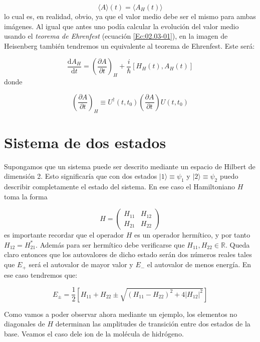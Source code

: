 \documentclass[12pt]{book}
\numberwithin{equation}{chapter}
\numberwithin{figure}{chapter}
\newcommand{\parentesis}[1]{\left( #1  \right)}
\newcommand{\parciales}[2]{\frac{\partial #1}{\partial #2}}
\newcommand{\ccorchetes}[1]{\left[ #1  \right]}
\newcommand{\D}{\mathrm{d}}
\newcommand{\derivadas}[2]{\frac{\D #1}{\D #2}}
\begin{document}
\begin{equation}
\langle A \rangle (t) = \langle A_H (t) \rangle
\end{equation}
lo cual es, en realidad, obvio, ya que el valor medio debe ser el mismo para ambas imágenes. Al igual que antes uno podía calcular la evolución del valor medio usando el \textit{teorema de Ehrenfest} (ecuación  \ref{Ec:02.03-01}), en la imagen de Heisenberg también tendremos un equivalente al teorema de Ehrenfest. Este será:

\begin{equation}
\derivadas{A_H}{t} = \parentesis{\parciales{A}{t}}_H + \frac{i}{\hbar} \ccorchetes{ H_H (t), A_H (t) }
\end{equation}
donde 

\begin{equation}
 \parentesis{\parciales{A}{t}}_H  \equiv U^\dagger (t,t_0) 
 \parentesis{\parciales{A}{t}} U (t,t_0)
\end{equation}


\section{Sistema de dos estados}

Supongamos que un sistema puede ser descrito mediante un espacio de Hilbert de dimensión 2. Esto significaría que con dos estados $|1\rangle \equiv \psi_1$ y $|2\rangle \equiv \psi_2$ puedo describir completamente el estado del sistema. En ese caso el Hamiltoniano $H$ toma la forma

\begin{equation}
H = \begin{pmatrix}
H_{11} & H_{12} \\
H_{21} & H_{22}
\end{pmatrix}
\end{equation} 
es importante recordar que el operador $H$ es un operador hermítico, y por tanto $H_{12} = H^*_{21}$. Además para ser hermítico debe verificarse que $H_{11},H_{22} \in \mathbb{R}$. Queda claro entonces que los autovalores de dicho estado serán dos números reales tales que $E_+$ será el autovalor de mayor valor y $E_-$ el autovalor de menos energía. En ese caso tendremos que:

\begin{equation}
E_\pm = \frac{1}{2} \ccorchetes{H_{11}+H_{22}\pm\sqrt{(H_{11}-H_{22} )^2 + 4 |H_{12}|^2}} \label{Ec:2.07-Dos_estados}
\end{equation}

Como vamos a poder observar ahora mediante un ejemplo, los elementos no diagonales de $H$ determinan las amplitudes de transición entre dos estados de la base. Veamos el caso dele ion de la molécula de hidrógeno. \\  
\end{document}

